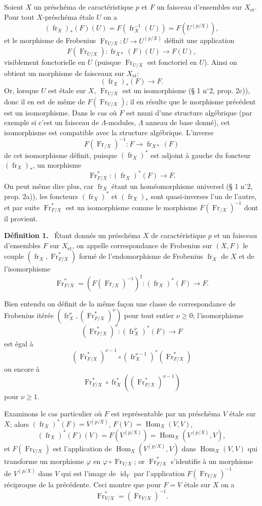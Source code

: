 \documentclass[11pt]{article}
\newenvironment{statement}[1]{\par\medskip\noindent\textbf{#1.}\ }{\par\medskip}
\DeclareMathOperator{\Hom}{Hom}
\providecommand{\et}{\mathrm{\acute{e}t}}
\providecommand{\id}{\operatorname{id}}
\providecommand{\Hom}{\operatorname{Hom}}
\providecommand{\id}{\operatorname{id}}
\providecommand{\id}{\operatorname{id}}
\providecommand{\id}{\operatorname{id}}
\providecommand{\id}{\operatorname{id}}
\providecommand{\Hom}{\operatorname{Hom}}
\providecommand{\fr}{\operatorname{fr}}
\providecommand{\Fr}{\operatorname{Fr}}
\providecommand{\Fr}{\operatorname{Fr}}
\providecommand{\fr}{\operatorname{fr}}
\providecommand{\id}{\operatorname{id}}
\providecommand{\et}{\acute{e}t}
\begin{document}
Soient $X$ un préschéma de caractéristique $p$ et $F$ un faisceau d'ensembles sur $X_{\et}$. Pour tout $X$-préschéma étale $U$ on a
\[
(\fr_X)_*(F)(U)=F(\fr_X^{-1}(U))=F(U^{(p/X)}),
\]
et le morphisme de Frobenius $\Fr_{U/X}:U\to U^{(p/X)}$ définit une application
\[
F(\Fr_{U/X}):\fr_{X*}(F)(U)\longrightarrow F(U),
\]
visiblement fonctorielle en $U$ (puisque $\Fr_{U/X}$ est fonctoriel en $U$). Ainsi on obtient un morphisme de faisceaux sur $X_{\et}$:
\[
(\fr_X)_*(F)\longrightarrow F.
\]
Or, lorsque $U$ est étale sur $X$, $\Fr_{U/X}$ est un isomorphisme (§ 1 n$^\circ$2, prop. 2c)), donc il en est de même de $F(\Fr_{U/X})$; il en résulte que le morphisme précédent est un isomorphisme. Dans le cas où $F$ est muni d'une structure algébrique (par exemple si c'est un faisceau de $\Lambda$-modules, $\Lambda$ anneau de base donné), cet isomorphisme est compatible avec la structure algébrique. L'inverse
\[
F(\Fr_{/X})^{-1}:F\longrightarrow \fr_{X*}(F)
\]
de cet isomorphisme définit, puisque $(\fr_X)^*$ est adjoint à gauche du foncteur $(\fr_X)_*$, un morphisme
\[
\Fr^*_{F/X}:(\fr_X)^*(F)\longrightarrow F.
\]
On peut même dire plus, car $\fr_X$ étant un homéomorphisme universel (§ 1 n$^\circ$2, prop. 2a)), les foncteurs $(\fr_X)^*$ et $(\fr_X)_*$ sont quasi-inverses l'un de l'autre, et par suite $\Fr^*_{F/X}$ est un isomorphisme comme le morphisme $F(\Fr_{/X})^{-1}$ dont il provient.

\begin{statement}{Définition 1}
Étant donnés un préschéma $X$ de caractéristique $p$ et un faisceau d'ensembles $F$ sur $X_{\et}$, on appelle correspondance de Frobenius sur $(X,F)$ le couple $(\fr_X,\Fr^*_{F/X})$ formé de l'endomorphisme de Frobenius $\fr_X$ de $X$ et de l'isomorphisme
\[
\Fr^*_{F/X}=(F(\Fr_{/X})^{-1})^\sharp:(\fr_X)^*(F)\longrightarrow F.
\]
\end{statement}

Bien entendu on définit de la même façon une classe de correspondance de Frobenius itérée $(\fr_X^\nu,(\Fr^*_{F/X})^\nu)$ pour tout entier $\nu\geq0$; l'isomorphisme
\[
(\Fr^*_{F/X})^\nu:(\fr_X^\nu)^*(F)\longrightarrow F
\]
est égal à
\[
(\Fr^*_{F/X})^{\nu-1}\circ (\fr_X^{\nu-1})^*(\Fr^*_{F/X})
\]
ou encore à
\[
\Fr^*_{F/X}\circ\fr_X^*((\Fr^*_{F/X})^{\nu-1})
\]
pour $\nu\geq1$.

Examinons le cas particulier où $F$ est représentable par un préschéma $V$ étale sur $X$; alors $(\fr_X)^*(F)=V^{(p/X)}$, $F(V)=\Hom_X(V,V)$,
\[
(\fr_X)^*(F)(V)=F(V^{(p/X)})=\Hom_X(V^{(p/X)},V),
\]
et $F(\Fr_{V/X})$ est l'application de $\Hom_X(V^{(p/X)},V)$ dans $\Hom_X(V,V)$ qui transforme un morphisme $\varphi$ en $\varphi\circ\Fr_{V/X}$; or $\Fr^*_{F/X}$ s'identifie à un morphisme de $V^{(p/X)}$ dans $V$ qui est l'image de $\id_V$ par l'application $F(\Fr_{V/X})^{-1}$ réciproque de la précédente. Ceci montre que pour $F=V$ étale sur $X$ on a
\[
\Fr^*_{V/X}=(\Fr_{V/X})^{-1}.
\]
\end{document}
